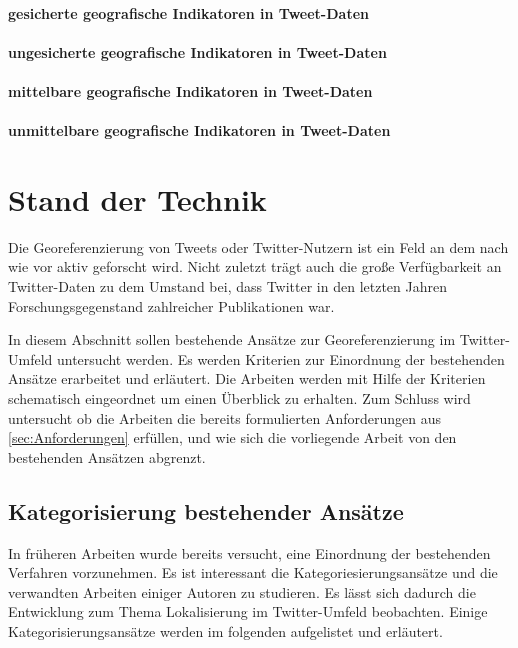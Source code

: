 			\subsubsection{gesicherte geografische Indikatoren in Tweet-Daten}

			\subsubsection{ungesicherte geografische Indikatoren in Tweet-Daten}

			\subsubsection{mittelbare geografische Indikatoren in Tweet-Daten}

			\subsubsection{unmittelbare geografische Indikatoren in Tweet-Daten} 

\chapter{Stand der Technik} 
	Die Georeferenzierung von Tweets oder Twitter-Nutzern ist ein Feld an dem nach wie vor aktiv geforscht wird.
	Nicht zuletzt trägt auch die große Verfügbarkeit an Twitter-Daten zu dem Umstand bei, dass Twitter in den letzten Jahren Forschungsgegenstand zahlreicher Publikationen war. 
	
	In diesem Abschnitt sollen bestehende Ansätze zur Georeferenzierung im Twitter-Umfeld untersucht werden. 
	Es werden Kriterien zur Einordnung der bestehenden Ansätze erarbeitet und erläutert.   
	Die Arbeiten werden mit Hilfe der Kriterien schematisch eingeordnet um einen Überblick zu erhalten. 
	Zum Schluss wird untersucht ob die Arbeiten die bereits formulierten Anforderungen aus \ref{sec:Anforderungen} erfüllen, und wie sich die vorliegende Arbeit von den bestehenden Ansätzen abgrenzt.    

		\section{Kategorisierung bestehender Ansätze}

		In früheren Arbeiten wurde bereits versucht, eine Einordnung der bestehenden Verfahren vorzunehmen. 
		Es ist interessant die Kategoriesierungsansätze und die verwandten Arbeiten einiger Autoren zu studieren.
		Es lässt sich dadurch die Entwicklung zum Thema Lokalisierung im Twitter-Umfeld beobachten. 
		Einige Kategorisierungsansätze werden im folgenden aufgelistet und erläutert.

